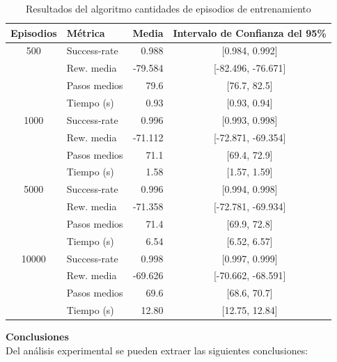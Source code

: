 \begin{table}[h!]
    \centering
    \begin{tabular}{|c|l|r|c|}
    \hline
    Episodios & Métrica        & Media    & Intervalo de Confianza del 95\% \\
    \hline
    500   & Success-rate  & 0.988   & [0.984, 0.992] \\
          & Rew. media    & -79.584 & [-82.496, -76.671] \\
          & Pasos medios  & 79.6    & [76.7, 82.5] \\
          & Tiempo (s)    & 0.93    & [0.93, 0.94] \\
    \hline
    1000  & Success-rate  & 0.996   & [0.993, 0.998] \\
          & Rew. media    & -71.112 & [-72.871, -69.354] \\
          & Pasos medios  & 71.1    & [69.4, 72.9] \\
          & Tiempo (s)    & 1.58    & [1.57, 1.59] \\
    \hline
    5000  & Success-rate  & 0.996   & [0.994, 0.998] \\
          & Rew. media    & -71.358 & [-72.781, -69.934] \\
          & Pasos medios  & 71.4    & [69.9, 72.8] \\
          & Tiempo (s)    & 6.54    & [6.52, 6.57] \\
    \hline
    10000 & Success-rate  & 0.998   & [0.997, 0.999] \\
          & Rew. media    & -69.626 & [-70.662, -68.591] \\
          & Pasos medios  & 69.6    & [68.6, 70.7] \\
          & Tiempo (s)    & 12.80   & [12.75, 12.84] \\
    \hline
    \end{tabular}
    \caption{Resultados del algoritmo cantidades de episodios de entrenamiento}
    \label{tab:qlearning_episodios}
\end{table}
    

\textbf{Conclusiones}
\\

Del análisis experimental se pueden extraer las siguientes conclusiones:

